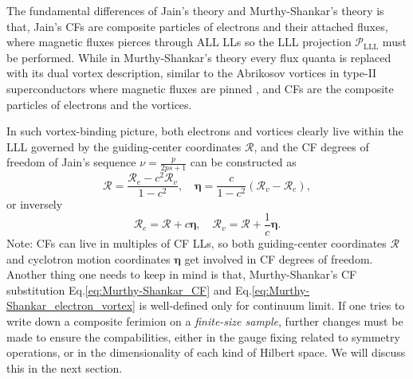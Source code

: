 The fundamental differences of Jain's theory and Murthy-Shankar's theory is that, Jain's CFs are composite particles of electrons and their attached fluxes, where magnetic fluxes pierces through ALL LLs so the LLL projection $\mathcal P_{\text{LLL}}$ must be performed. While in Murthy-Shankar's theory every flux quanta is replaced with its dual vortex description, similar to the Abrikosov vortices in type-II superconductors where magnetic fluxes are pinned \cite{abrikosov2004nobel}, and CFs are the composite particles of electrons and the vortices.

In such vortex-binding picture, both electrons and vortices clearly live within the LLL governed by the guiding-center coordinates $\bm{\mathcal R}$, and the CF degrees of freedom of Jain's sequence $\nu=\frac{p}{2ps+1}$ can be constructed as \cite{murthy1999hamiltonian,murthy2001hamiltonian,murthy2003hamiltonian}
\begin{equation}\label{eq:Murthy-Shankar_CF}
    \bm{\mathcal R}=\frac{\bm{\mathcal R}_e-c^2\bm{\mathcal R}_v}{1-c^2},\quad \bm\eta=\frac{c}{1-c^2}(\bm{\mathcal R}_v-\bm{\mathcal R}_e),
\end{equation}
or inversely
\begin{equation}\label{eq:Murthy-Shankar_electron_vortex}
    \bm{\mathcal R}_e=\bm{\mathcal R}+c\bm\eta,\quad\bm{\mathcal R}_v=\bm{\mathcal R}+\frac{1}{c}\bm\eta.
\end{equation}
Note: CFs can live in multiples of CF LLs, so both guiding-center coordinates $\bm{\mathcal R}$ and cyclotron motion coordinates $\bm\eta$ get involved in CF degrees of freedom. Another thing one needs to keep in mind is that, Murthy-Shankar's CF substitution Eq.\eqref{eq:Murthy-Shankar_CF} and Eq.\eqref{eq:Murthy-Shankar_electron_vortex} is well-defined only for continuum limit. If one tries to write down a composite ferimion on a \emph{finite-size sample}, further changes must be made to ensure the compabilities, either in the gauge fixing related to symmetry operations, or in the dimensionality of each kind of Hilbert space. We will discuss this in the next section.

